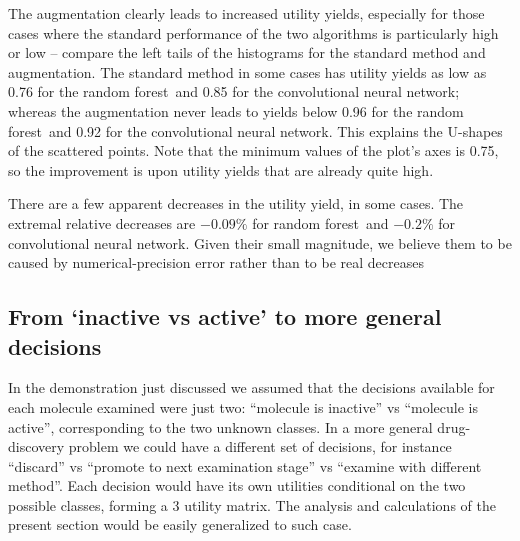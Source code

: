 \documentclass[\ifafour a4paper,12pt,\else a5paper,10pt,\fi%
onecolumn,oneside,article,%
british%
]{memoir}
\theoremstyle{remark}
\theoremstyle{innote}
\renewcommand*{\|}[1][]{\nonscript\:#1\vert\nonscript\:\mathopen{}}
\newcommand*{\RF}{random forest}
\newcommand*{\CNN}{convolutional neural network}
\begin{document}
The augmentation clearly leads to increased utility yields, especially for those cases where the standard performance of the two algorithms is particularly high or low -- compare the left tails of the histograms for the standard method and augmentation. The standard method in some cases has utility yields as low as 0.76 for the \RF\ and 0.85 for the \CNN; whereas the augmentation never leads to yields below 0.96 for the \RF\ and 0.92 for the \CNN. This explains the U-shapes of the scattered points. Note that the minimum values of the plot's axes is 0.75, so the improvement is upon utility yields that are already quite high.

There are a few apparent decreases in the utility yield, in some cases. The extremal relative decreases are $-0.09\%$ for \RF\ and  $-0.2\%$ for \CNN. Given their small magnitude, we believe them to be caused by numerical-precision error rather than to be real decreases %

\subsection{From `inactive vs active' to more general decisions}
\label{sec:gen_decision}

In the demonstration just discussed we assumed that the decisions available for each molecule examined were just two: \enquote{molecule is inactive} vs \enquote{molecule is active}, corresponding to the two unknown classes. In a more general drug-discovery problem we could have a different set of decisions, for instance \enquote{discard} vs \enquote{promote to next examination stage} vs \enquote{examine with different method}. Each decision would have its own utilities conditional on the two possible classes, forming a 3 utility matrix. The analysis and calculations of the present section would be easily generalized to such case.
\end{document}
